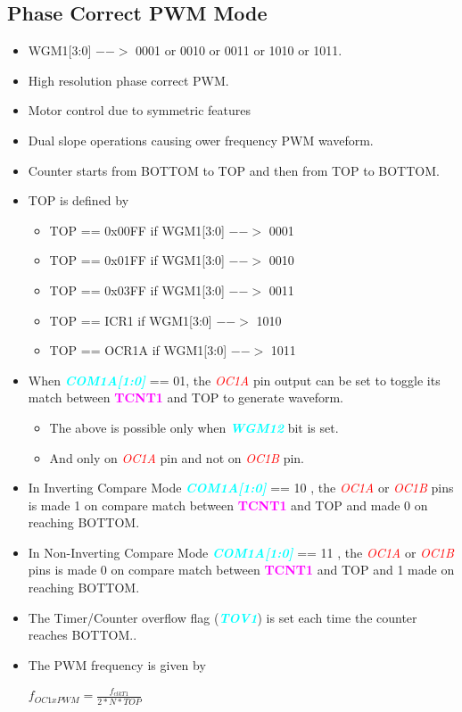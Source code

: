 \documentclass{article}
\newcommand{\bitFormat}[1]{\emph{\textbf{\textcolor{cyan}{#1}}}}
\newcommand{\regFormat}[1]{\textbf{\textcolor{magenta}{#1}}}
\newcommand{\pinFormat}[1]{\emph{\textcolor{red}{#1}}}
\begin{document}
\subsection{Phase Correct PWM Mode}
\begin{itemize}
    \item WGM1[3:0] $-->$ 0001 or 0010 or 0011 or 1010 or 1011.    
    \item High resolution phase correct PWM.
    \item Motor control due to symmetric features
    \item Dual slope operations causing ower frequency PWM waveform.
    \item Counter starts from BOTTOM to TOP and then from TOP to BOTTOM.
    \item TOP is defined by
    \begin{itemize}
        \item TOP == 0x00FF if WGM1[3:0] $-->$ 0001
        \item TOP == 0x01FF if WGM1[3:0] $-->$ 0010
        \item TOP == 0x03FF if WGM1[3:0] $-->$ 0011
        \item TOP ==   ICR1 if WGM1[3:0] $-->$ 1010
        \item TOP ==  OCR1A if WGM1[3:0] $-->$ 1011
    \end{itemize}
    \item  When \bitFormat{COM1A[1:0]} == 01, the \pinFormat{OC1A} pin output can be set to toggle its match between \regFormat{TCNT1} and TOP to generate waveform.
    \begin{itemize}
        \item The above is possible only when \bitFormat{WGM12} bit is set.
        \item And only on \pinFormat{OC1A} pin and not on \pinFormat{OC1B} pin.
    \end{itemize}
    \item In Inverting Compare Mode \bitFormat{COM1A[1:0]} == 10 , the \pinFormat{OC1A} or \pinFormat{OC1B} pins is made 1 on compare match between \regFormat{TCNT1} and TOP and made 0 on reaching BOTTOM.
    \item In Non-Inverting Compare Mode \bitFormat{COM1A[1:0]} == 11 , the \pinFormat{OC1A} or \pinFormat{OC1B} pins is made 0 on compare match between \regFormat{TCNT1} and TOP and 1 made  on reaching BOTTOM.
    \item The Timer/Counter overflow flag (\bitFormat{TOV1}) is set each time the counter reaches BOTTOM..
    \item The PWM frequency is given by 
    \begin{center}
        { \Large $f_{OC1xPWM} = \frac{f_{clkT1}}{2 * N * TOP}$ }
    \end{center}
\end{itemize}
\end{document}

